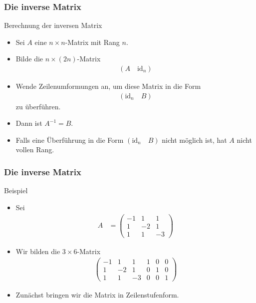 \documentclass{beamer}
\newcommand{\id}{\mathrm{id}}
\newcommand\bc[1]{\left({#1}\right)}
\renewcommand{\ae}{\"a}
\renewcommand{\oe}{\"o}
\newcommand{\ue}{\"u}
\newcommand{\Ue}{\"U}
\newcommand{\mytitle}{Die inverse Matrix}
\begin{document}
\begin{frame}\frametitle{\mytitle}
	\begin{block}{Berechnung der inversen Matrix}
	\begin{itemize}
	\item Sei $A$ eine $n\times n$-Matrix mit Rang $n$. 
	\item Bilde die $n\times(2n)$-Matrix
		\begin{align*}
			\bc{A\quad\id_n}
		\end{align*}
	\item Wende Zeilenumformungen an, um diese Matrix in die Form
		\begin{align*}
			\bc{\id_n\quad B}
		\end{align*}
		zu \ue berf\ue hren.
	\item Dann ist $A^{-1}=B$.
	\item Falls eine \Ue berf\ue hrung in die Form $(\id_n\quad B)$ nicht m\oe glich ist, hat $A$ nicht vollen Rang.
	\end{itemize}	
	\end{block}
\end{frame}

\begin{frame}\frametitle{\mytitle}
	\begin{block}{Beispiel}
	\begin{itemize}
		\item Sei
			\begin{align*}
				A&=\begin{pmatrix}
					-1&1&1\\1&-2&1\\1&1&-3
				\end{pmatrix}
			\end{align*}
		\item Wir bilden die $3\times 6$-Matrix
\begin{align*}
				\begin{pmatrix}
					-1&1&1&1&0&0\\1&-2&1&0&1&0\\1&1&-3&0&0&1 
				\end{pmatrix}
			\end{align*}
		\item Zun\ae chst bringen wir die Matrix in Zeilenstufenform.
	\end{itemize}	
	\end{block}
\end{frame}
\end{document}
